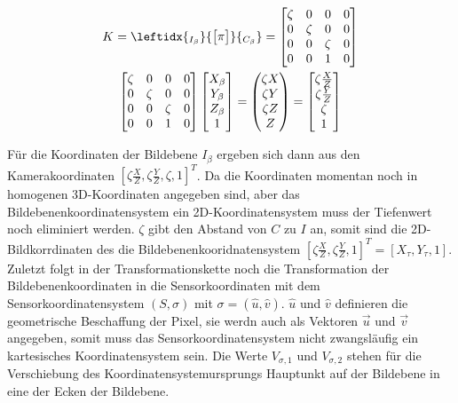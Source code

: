 	\begin{gather}
K = 
\leftidx{_{{I_\beta}}}{\begin{bmatrix}
	\pi
	\end{bmatrix}}{_{{C_\beta}}}
=
\begin{bmatrix}
\zeta&0&0&0\\
0&\zeta&0&0\\
0&0&\zeta&0\\
0&0&1&0
\end{bmatrix}\\
\begin{bmatrix}
\zeta&0&0&0\\
0&\zeta&0&0\\
0&0&\zeta&0\\
0&0&1&0
\end{bmatrix}
\begin{bmatrix}
X_\beta\\Y_\beta\\Z_\beta\\1
\end{bmatrix} =
\begin{pmatrix}
\zeta X\\ \zeta Y\\ \zeta Z \\ Z
\end{pmatrix}
=
\begin{bmatrix}
\zeta \frac{X}{Z}\\ \zeta \frac{Y}{Z}\\ \zeta  \\ 1
\end{bmatrix}
\end{gather}

Für die Koordinaten der Bildebene $I_\beta$ ergeben sich dann aus den Kamerakoordinaten $[\zeta \frac{X}{Z},\zeta\frac{Y}{Z},\zeta,1]^T$. Da die Koordinaten momentan noch in homogenen 3D-Koordinaten angegeben sind, aber das Bildebenenkoordinatensystem ein 2D-Koordinatensystem muss der Tiefenwert noch eliminiert werden. $\zeta$ gibt den Abstand von $C$ zu $I$ an, somit sind die 2D-Bildkorrdinaten des die Bildebenenkooridnatensystem  $[\zeta \frac{X}{Z},\zeta\frac{Y}{Z},1]^T = [X_\tau, Y_\tau,1]$. Zuletzt folgt in der Transformationskette noch die Transformation der Bildebenenkoordinaten in die Sensorkoordinaten mit dem Sensorkoordinatensystem $(S,\sigma)$ mit $\sigma = (\hat{u},\hat{v})$. $\hat{u}$ und $\hat{v}$ definieren die geometrische Beschaffung der Pixel, sie werdn auch als Vektoren $\vec{u}$ und $\vec{v}$ angegeben, somit muss das Sensorkoordinatensystem nicht zwangsläufig ein kartesisches Koordinatensystem sein. Die Werte $V_{\sigma,1}$ und $V_{\sigma,2}$ stehen für die Verschiebung des Koordinatensystemursprungs Hauptunkt auf der Bildebene in eine der Ecken der Bildebene.
		
